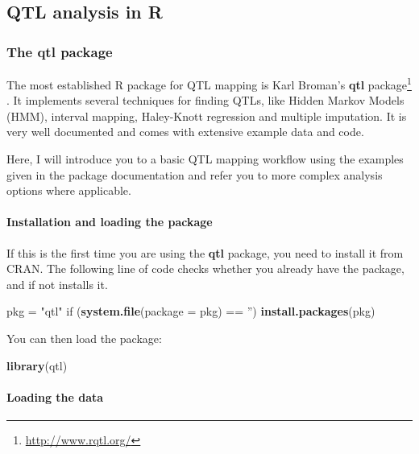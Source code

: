 \documentclass[12pt,]{krantz}
\newenvironment{Shaded}{\begin{snugshade}}{\end{snugshade}}
\newcommand{\KeywordTok}[1]{\textcolor[rgb]{0.27,0.27,0.27}{\textbf{{#1}}}}
\newcommand{\DataTypeTok}[1]{\textcolor[rgb]{0.27,0.27,0.27}{{#1}}}
\newcommand{\StringTok}[1]{\textcolor[rgb]{0.5,0.5,0.5}{{#1}}}
\newcommand{\NormalTok}[1]{{#1}}
\let\oldparagraph\paragraph
\renewcommand{\paragraph}[1]{\oldparagraph{#1}\mbox{}}
\renewcommand{\href}[2]{#2\footnote{\url{#1}}}
\theoremstyle{definition}
\theoremstyle{definition}
\theoremstyle{remark}
\begin{document}
\subsection{QTL analysis in R}\label{qtl-analysis-in-r}

\subsubsection{The qtl package}\label{the-qtl-package}

The most established R package for QTL mapping is Karl Broman's
\href{http://www.rqtl.org/}{\textbf{qtl} package}
\citep{R-qtl}. It implements several techniques for finding QTLs, like
Hidden Markov Models (HMM), interval mapping, Haley-Knott regression and
multiple imputation. It is very well documented and comes with extensive
example data and code.

Here, I will introduce you to a basic QTL mapping workflow using the
examples given in the package documentation and refer you to more
complex analysis options where applicable.

\paragraph{Installation and loading the
package}\label{installation-and-loading-the-package}

If this is the first time you are using the \textbf{qtl}
package, you need to install it from CRAN. The following line of code
checks whether you already have the package, and if not installs it.

\begin{Shaded}
\begin{Highlighting}[]
\NormalTok{pkg =}\StringTok{ "qtl"}
\NormalTok{if (}\KeywordTok{system.file}\NormalTok{(}\DataTypeTok{package =} \NormalTok{pkg) ==}\StringTok{ ''}\NormalTok{) }\KeywordTok{install.packages}\NormalTok{(pkg)}
\end{Highlighting}
\end{Shaded}

You can then load the package:

\begin{Shaded}
\begin{Highlighting}[]
\KeywordTok{library}\NormalTok{(qtl)}
\end{Highlighting}
\end{Shaded}

\paragraph{Loading the data}\label{loading-the-data}
\end{document}
